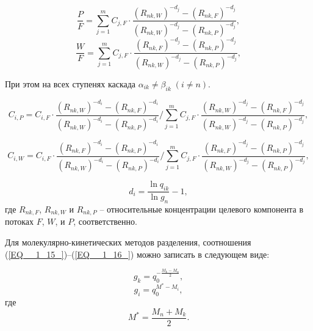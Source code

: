 \begin{equation} \label{GrindEQ__1_70_} 
  \frac{P}{F} =\sum _{j=1}^{m}C_{j,F} \cdot \frac{(R_{nk,W} )^{-d_{j} } -(R_{nk,F} )^{-d_{j} } }{(R_{nk,W} )^{-d_{j} } -(R_{nk,P} )^{-d_{j} } }  ,                                            
\end{equation} 
\begin{equation} \label{GrindEQ__1_71_} 
  \frac{W}{F} =\sum _{j=1}^{m}C_{j,F} \cdot \frac{(R_{nk,F} )^{-d_{j} } -(R_{nk,P} )^{-d_{j} } }{(R_{nk,W} )^{-d_{j} } -(R_{nk,P} )^{-d_{j} } }  ,                                        
\end{equation} 

При этом на всех ступенях каскада $\alpha _{ik} \ne \beta _{ik} \; (i\ne n)$.

\begin{equation} \label{GrindEQ__1_72_} 
  C_{i,P}=C_{i,F} \cdot \frac{\left(R_{n k,W}\right)^{-d_{i}}-\left(R_{n k,F}\right)^{-d_{i}}}{\left(R_{n k,W}\right)^{-d_{i}}-\left(R_{n k,P}\right)^{-d_{i}}} / \sum_{j=1}^{m} C_{j,F} \cdot \frac{\left(R_{n k,W}\right)^{-d_{j}}-\left(R_{n k,F}\right)^{-d_{j}}}{\left(R_{n k,W}\right)^{-d_{j}}-\left(R_{n k,P}\right)^{-d_{j}}},
\end{equation} 

\begin{equation} \label{GrindEQ__1_73_} 
  C_{i,W}=C_{i,F} \cdot \frac{\left(R_{n k,F}\right)^{-d_{i}}-\left(R_{n k,P}\right)^{-d_{i}}}{\left(R_{n k,W}\right)^{-d_{i}}-\left(R_{n k,P}\right)^{-d_{i}}} / \sum_{j=1}^{m} C_{j,F} \cdot \frac{\left(R_{n k,F}\right)^{-d_{j}}-\left(R_{n k,P}\right)^{-d_{j}}}{\left(R_{n k,W}\right)^{-d_{j}}-\left(R_{n k,P}\right)^{-d_{j}}},
\end{equation} 

\begin{equation} \label{GrindEQ__1_74_} 
  d_{i} =\frac{\ln q_{ik} }{\ln g_{n} } -1,              
\end{equation}
где $R_{n k,F}$, $R_{n k,W}$ и $R_{n k,P}$ -- относительные концентрации целевого компонента в потоках $F$, $W$, и $P$, соответственно.


Для молекулярно-кинетических методов разделения, соотношения (\ref{EQ__1_15_})--(\ref{EQ__1_16_}) можно записать в следующем виде:

\begin{equation} \label{GrindEQ__1_75_} 
  g_{k} =q_{0}^{-\frac{M_{k} -M_{n} }{2} } ,        
\end{equation} 
\begin{equation} \label{GrindEQ__1_76_} 
  g_{i} =q_{0}^{M^{*} -M_{i} } ,        
\end{equation} 
где 
\begin{equation} \label{EQ_Mstar} 
  M^{*} =\frac{M_{n} +M_{k} }{2}.    
\end{equation} 


